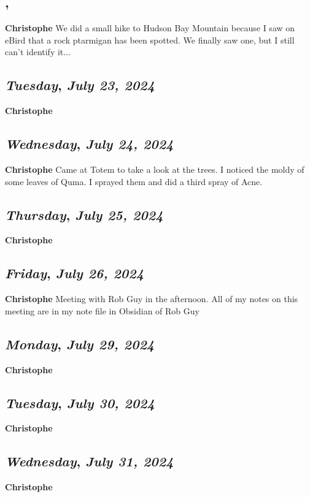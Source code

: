 \subsection*{\weekday, \day}
\textbf {Christophe}
We did a small hike to Hudson Bay Mountain because I saw on eBird that a rock ptarmigan has been spotted. We finally saw one,  but I still can't identify it...

\def\day{\textit{July 23, 2024}}
\def\weekday{\textit{Tuesday}}
\subsection*{\weekday, \day}
\textbf {Christophe}

\def\day{\textit{July 24, 2024}}
\def\weekday{\textit{Wednesday}}
\subsection*{\weekday, \day}
\textbf {Christophe}
Came at Totem to take a look at the trees. I noticed the moldy of some leaves of Quma. I sprayed them and did a third spray of Acne.

\def\day{\textit{July 25, 2024}}
\def\weekday{\textit{Thursday}}
\subsection*{\weekday, \day}
\textbf {Christophe}

\def\day{\textit{July 26, 2024}}
\def\weekday{\textit{Friday}}
\subsection*{\weekday, \day}
\textbf {Christophe}
Meeting with Rob Guy in the afternoon. All of my notes on this meeting are in my note file in Obsidian of Rob Guy


\def\day{\textit{July 29, 2024}}
\def\weekday{\textit{Monday}}
\subsection*{\weekday, \day}
\textbf {Christophe}

\def\day{\textit{July 30, 2024}}
\def\weekday{\textit{Tuesday}}
\subsection*{\weekday, \day}
\textbf {Christophe}

\def\day{\textit{July 31, 2024}}
\def\weekday{\textit{Wednesday}}
\subsection*{\weekday, \day}
\textbf {Christophe}
